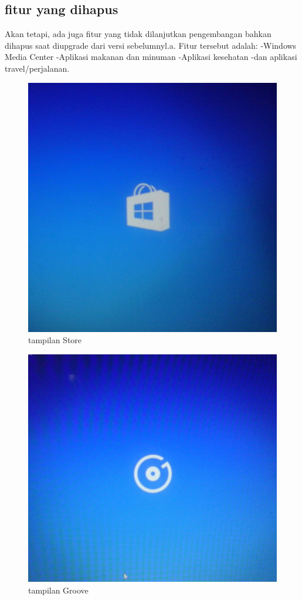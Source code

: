 		\subsection{fitur yang dihapus}
			Akan tetapi, ada juga fitur yang tidak dilanjutkan pengembangan bahkan dihapus saat diupgrade dari versi sebelumnyl.a. Fitur tersebut adalah:
			-Windows Media Center
			-Aplikasi makanan dan minuman
			-Aplikasi kesehatan
			-dan aplikasi travel/perjalanan.

\begin{figure}[ht]
\centerline{\includegraphics[width=1\textwidth]{figures/Store.JPG}}
\caption{tampilan Store}
\label{Store}
\end{figure}

\begin{figure}[ht]
\centerline{\includegraphics[width=1\textwidth]{figures/Groove.JPG}}
\caption{tampilan Groove}
\label{Groove}
\end{figure}

